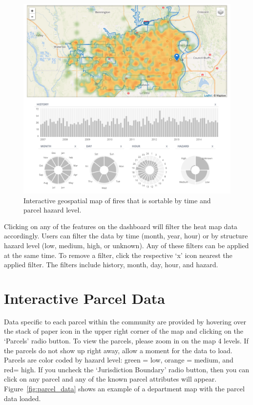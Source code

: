 \documentclass[12pt,oneside]{book}
\begin{document}
\begin{figure}[ht!]
\centering
\includegraphics[width=.9\columnwidth]{Figures/interactive_fire_map}
\caption{Interactive geospatial map of fires that is sortable by time and parcel hazard level.}
\label{fig:interactive_fire_map}
\end{figure}

Clicking on any of the features on the dashboard will filter the heat map data accordingly. Users can filter the data by time (month, year, hour) or by structure hazard level (low, medium, high, or unknown). Any of these filters can be applied at the same time. To remove a filter, click the respective `x' icon nearest the applied filter. The filters include history, month, day, hour, and hazard.

\FloatBarrier

\section{Interactive Parcel Data}

Data specific to each parcel within the community are provided by hovering over the stack of paper icon in the upper right corner of the map and clicking on the `Parcels' radio button. To view the parcels, please zoom in on the map 4 levels. If the parcels do not show up right away, allow a moment for the data to load. Parcels are color coded by hazard level: green = low, orange = medium, and red= high. If you uncheck the `Jurisdiction Boundary' radio button, then you can click on any parcel and any of the known parcel attributes will appear. Figure~\ref{fig:parcel_data} shows an example of a department map with the parcel data loaded.
\end{document}
